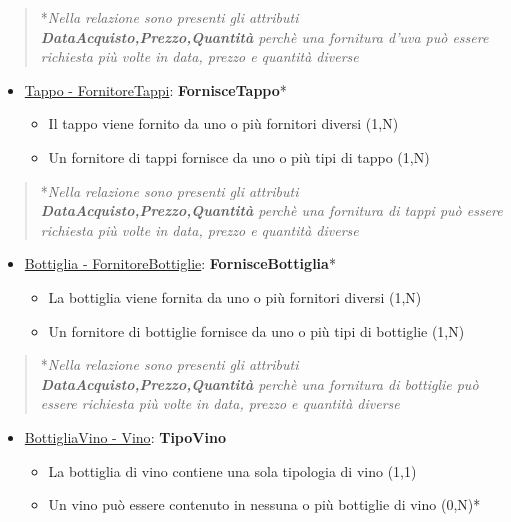 \begin{verse}
*\emph{Nella relazione sono presenti gli attributi \textbf{DataAcquisto,Prezzo,Quantità} perchè una fornitura d'uva può essere richiesta più volte in data, prezzo e quantità diverse}
\end{verse}

\begin{itemize}
	\item \underline{Tappo - FornitoreTappi}: \textbf{FornisceTappo}*
	
	\begin{itemize}
		\item Il tappo viene fornito da uno o più fornitori diversi (1,N)
		\item Un fornitore di tappi fornisce da uno o più tipi di tappo (1,N)
	\end{itemize}
	
\end{itemize}


\begin{verse}
	*\emph{Nella relazione sono presenti gli attributi \textbf{DataAcquisto,Prezzo,Quantità} perchè una fornitura di tappi può essere richiesta più volte in data, prezzo e quantità diverse}
\end{verse}


\begin{itemize}
	\item \underline{Bottiglia - FornitoreBottiglie}: \textbf{FornisceBottiglia}*
	
	\begin{itemize}
		\item La bottiglia viene fornita da uno o più fornitori diversi (1,N)
		\item Un fornitore di bottiglie fornisce da uno o più tipi di bottiglie (1,N)
	\end{itemize}
	
\end{itemize}


\begin{verse}
	*\emph{Nella relazione sono presenti gli attributi \textbf{DataAcquisto,Prezzo,Quantità} perchè una fornitura di bottiglie può essere richiesta più volte in data, prezzo e quantità diverse}
\end{verse}

\begin{itemize}
	\item \underline{BottigliaVino - Vino}: \textbf{TipoVino}
	
	\begin{itemize}
		\item La bottiglia di vino contiene una sola tipologia di vino (1,1)
		\item Un vino può essere contenuto in nessuna o più bottiglie di vino (0,N)*
	\end{itemize}
	
\end{itemize}

